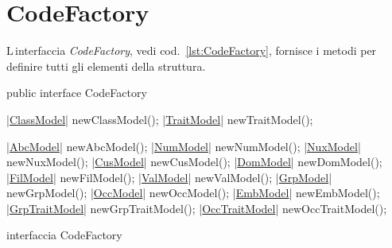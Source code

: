 \documentclass[a4paper,10pt]{report}
\newif\ifesource
\newenvironment{elisting}[1][!htb]
  {\captionsetup{aboveskip=0pt}\begin{listing}[#1]}
  {\end{listing}%
}
\begin{document}
\section{CodeFactory}
L\,interfaccia \textsl{CodeFactory}, vedi cod.~\ref{lst:CodeFactory}, fornisce i 
metodi per definire tutti gli elementi della struttura.

\ifesource
\begin{figure*}[!htb]
\begin{lstlisting}[language=java, caption=interfaccia CodeFactory, 
label=lst:CodeFactory]
public interface CodeFactory {
    (*\hyperref[lst:ClassModel]{ClassModel}*) newClassModel();
    (*\hyperref[lst:TraitModel]{TraitModel}*) newTraitModel();

    (*\hyperref[lst:AbcModel]{AbcModel}*) newAbcModel();
    (*\hyperref[lst:NumModel]{NumModel}*) newNumModel();
    (*\hyperref[lst:NuxModel]{NuxModel}*) newNuxModel();
    (*\hyperref[lst:CusModel]{CusModel}*) newCusModel();
    (*\hyperref[lst:DomModel]{DomModel}*) newDomModel();
    (*\hyperref[lst:FilModel]{FilModel}*) newFilModel();
    (*\hyperref[lst:ValModel]{ValModel}*) newValModel();
    (*\hyperref[lst:GrpModel]{GrpModel}*) newGrpModel();
    (*\hyperref[lst:OccModel]{OccModel}*) newOccModel();
    (*\hyperref[lst:EmbModel]{EmbModel}*) newEmbModel();
    (*\hyperref[lst:GrpTraitModel]{GrpTraitModel}*) newGrpTraitModel();
    (*\hyperref[lst:OccTraitModel]{OccTraitModel}*) newOccTraitModel();
}
\end{lstlisting}\index{CodeFactory}
\end{figure*}
\else
\begin{elisting}
\begin{javacode}
public interface CodeFactory {
    |\hyperref[lst:ClassModel]{ClassModel}| newClassModel();
    |\hyperref[lst:TraitModel]{TraitModel}| newTraitModel();

    |\hyperref[lst:AbcModel]{AbcModel}| newAbcModel();
    |\hyperref[lst:NumModel]{NumModel}| newNumModel();
    |\hyperref[lst:NuxModel]{NuxModel}| newNuxModel();
    |\hyperref[lst:CusModel]{CusModel}| newCusModel();
    |\hyperref[lst:DomModel]{DomModel}| newDomModel();
    |\hyperref[lst:FilModel]{FilModel}| newFilModel();
    |\hyperref[lst:ValModel]{ValModel}| newValModel();
    |\hyperref[lst:GrpModel]{GrpModel}| newGrpModel();
    |\hyperref[lst:OccModel]{OccModel}| newOccModel();
    |\hyperref[lst:EmbModel]{EmbModel}| newEmbModel();
    |\hyperref[lst:GrpTraitModel]{GrpTraitModel}| newGrpTraitModel();
    |\hyperref[lst:OccTraitModel]{OccTraitModel}| newOccTraitModel();
}
\end{javacode}
\caption{interfaccia CodeFactory}
\label{lst:CodeFactory}
\end{elisting}
\fi
\end{document}
